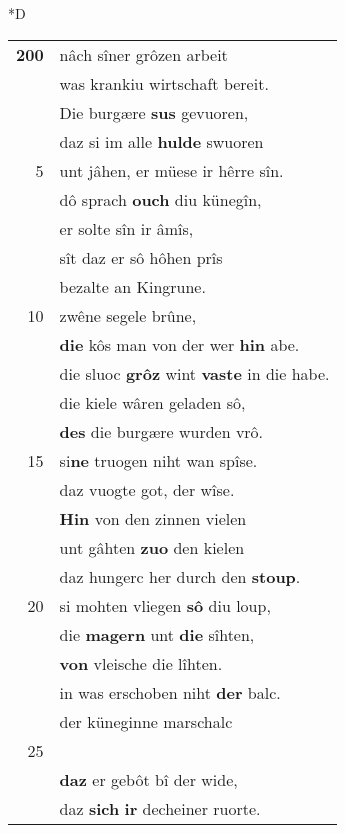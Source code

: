 \documentclass[8pt,a4paper,notitlepage]{article}
\begin{document}
\begin{table}[ht]
\begin{minipage}[t]{0.5\linewidth}
\small
\begin{center}*D
\end{center}
\begin{tabular}{rl}
\textbf{200} & nâch sîner grôzen arbeit\\ 
 & was krankiu wirtschaft bereit.\\ 
 & Die burgære \textbf{sus} gevuoren,\\ 
 & daz si im alle \textbf{hulde} swuoren\\ 
5 & unt jâhen, er müese ir hêrre sîn.\\ 
 & dô sprach \textbf{ouch} diu künegîn,\\ 
 & er solte sîn ir âmîs,\\ 
 & sît daz er sô hôhen prîs\\ 
 & bezalte an Kingrune.\\ 
10 & zwêne segele brûne,\\ 
 & \textbf{die} kôs man von der wer \textbf{hin} abe.\\ 
 & die sluoc \textbf{grôz} wint \textbf{vaste} in die habe.\\ 
 & die kiele wâren geladen sô,\\ 
 & \textbf{des} die burgære wurden vrô.\\ 
15 & si\textbf{ne} truogen niht wan spîse.\\ 
 & daz vuogte got, der wîse.\\ 
 & \textbf{Hin} von den zinnen vielen\\ 
 & unt gâhten \textbf{zuo} den kielen\\ 
 & daz hungerc her durch den \textbf{stoup}.\\ 
20 & si mohten vliegen \textbf{sô} diu loup,\\ 
 & die \textbf{magern} unt \textbf{die} sîhten,\\ 
 & \textbf{von} vleische die lîhten.\\ 
 & in was erschoben niht \textbf{der} balc.\\ 
 & der küneginne marschalc\\ 
25 & \textbf{\begin{large}T\end{large}et} den \textbf{schiffen} sölhen vride,\\ 
 & \textbf{daz} er gebôt bî der wide,\\ 
 & daz \textbf{sich} \textbf{ir} decheiner ruorte.\\ 

\end{tabular}
\end{minipage}
\end{table}
\end{document}
